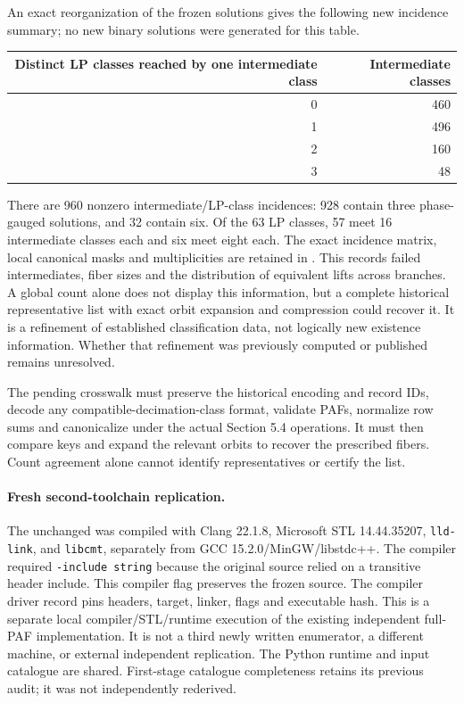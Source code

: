 \documentclass[11pt]{article}
\begin{document}
An exact reorganization of the frozen solutions gives the following new
incidence summary; no new binary solutions were generated for this table.
\begin{center}
\begin{tabular}{rr}\toprule
Distinct LP classes reached by one intermediate class & Intermediate classes\\\midrule
0 & 460\\ 1 & 496\\ 2 & 160\\ 3 & 48\\\bottomrule
\end{tabular}
\end{center}
There are 960 nonzero intermediate/LP-class incidences: 928 contain three
phase-gauged solutions, and 32 contain six. Of the 63 LP classes, 57 meet
16 intermediate classes each and six meet eight each. The exact incidence
matrix, local canonical masks and multiplicities are retained in
. This records failed intermediates,
fiber sizes and the distribution of equivalent lifts across branches.
A global count alone does not display this information, but a complete
historical representative list with exact orbit expansion and compression
could recover it. It is a refinement of established classification data,
not logically new existence information. Whether that refinement was
previously computed or published remains unresolved.

The pending crosswalk must preserve the historical encoding and record IDs,
decode any compatible-decimation-class format, validate PAFs, normalize row
sums and canonicalize under the actual Section 5.4 operations. It must then
compare keys and expand the relevant orbits to recover the prescribed fibers.
Count agreement alone cannot identify representatives or certify the list.

\paragraph{Fresh second-toolchain replication.}
The unchanged  was compiled with Clang 22.1.8,
Microsoft STL 14.44.35207, \texttt{lld-link}, and \texttt{libcmt}, separately
from GCC 15.2.0/MinGW/libstdc++. The compiler required \texttt{-include string}
because the original source relied on a transitive header include. This
compiler flag preserves the frozen source. The compiler driver record pins
headers, target, linker, flags and executable hash.
This is a separate local compiler/STL/runtime execution of the existing
independent full-PAF implementation. It is not a third newly written
enumerator, a different machine, or external independent replication.
The Python runtime and input catalogue are shared. First-stage catalogue
completeness retains its previous audit; it was not independently rederived.
\end{document}
